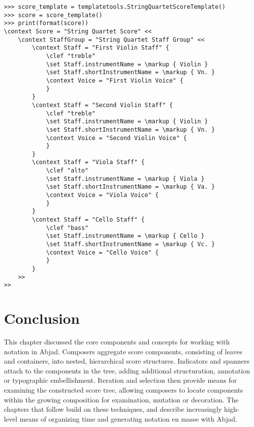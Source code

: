 \begin{abjadbookoutput}
\begin{singlespacing}
\vspace{-0.5\baselineskip}
\begin{verbatim}
>>> score_template = templatetools.StringQuartetScoreTemplate()
>>> score = score_template()
>>> print(format(score))
\context Score = "String Quartet Score" <<
    \context StaffGroup = "String Quartet Staff Group" <<
        \context Staff = "First Violin Staff" {
            \clef "treble"
            \set Staff.instrumentName = \markup { Violin }
            \set Staff.shortInstrumentName = \markup { Vn. }
            \context Voice = "First Violin Voice" {
            }
        }
        \context Staff = "Second Violin Staff" {
            \clef "treble"
            \set Staff.instrumentName = \markup { Violin }
            \set Staff.shortInstrumentName = \markup { Vn. }
            \context Voice = "Second Violin Voice" {
            }
        }
        \context Staff = "Viola Staff" {
            \clef "alto"
            \set Staff.instrumentName = \markup { Viola }
            \set Staff.shortInstrumentName = \markup { Va. }
            \context Voice = "Viola Voice" {
            }
        }
        \context Staff = "Cello Staff" {
            \clef "bass"
            \set Staff.instrumentName = \markup { Cello }
            \set Staff.shortInstrumentName = \markup { Vc. }
            \context Voice = "Cello Voice" {
            }
        }
    >>
>>
\end{verbatim}
\end{singlespacing}
\end{abjadbookoutput}

\section{Conclusion}
\label{ssec:a-model-of-notation-conclusion}

This chapter discussed the core components and concepts for working with
notation in Abjad. Composers aggregate score components, consisting of leaves
and containers, into nested, hierarchical score structures. Indicators and
spanners attach to the components in the tree, adding additional structuration,
annotation or typographic embellishment. Iteration and selection then provide
means for examining the constructed score tree, allowing composers to locate
components within the growing composition for examination, mutation or
decoration. The chapters that follow build on these techniques, and describe
increasingly high-level means of organizing time and generating notation en
masse with Abjad.